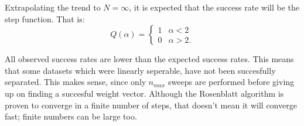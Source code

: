 Extrapolating the trend to \(N=\infty\), it is expected that the success rate will be the step function.
That is:
\begin{equation} \label{eq:step}
	Q(\alpha) =
	\begin{cases}
	    1 & \alpha < 2\\
	    0 & \alpha > 2\text{.}
	\end{cases}
\end{equation}

All observed success rates are lower than the expected success rates.
This means that some datasets which were linearly seperable, have not been succesfully separated.
This makes sense, since only \(n_{max}\) sweeps are performed before giving up on finding a succesful weight vector.
Although the Rosenblatt algorithm is proven to converge in a finite number of steps, that doesn't mean it will converge fast; finite numbers can be large too.